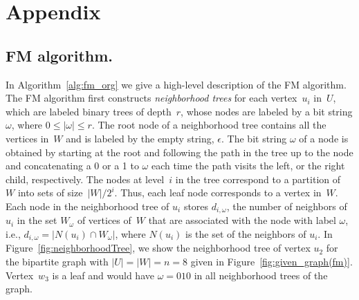 \newpage
\appendix
\section{Appendix}
\label{sec:appendix}

\subsection{\textsf{FM} algorithm.}\label{sec:appendix:FM}

In Algorithm~\ref{alg:fm_org} we give a high-level description of the \textsf{FM} algorithm. 
The \textsf{FM} algorithm first constructs \emph{neighborhood trees} for each vertex~$u_i$ in~$U$, which are
labeled binary trees of depth~$r$, whose nodes are labeled by a bit string $\omega$, where $0 \leq |\omega| \leq r$. 
The root node of a neighborhood tree contains all the vertices in~$W$ and is labeled by the empty string, $\epsilon$. 
The bit string $\omega$ of a node is obtained by starting at the root and following the path in the tree up to the node and concatenating a 0 or a 1 to $\omega$ each time the path visits the left, or the right child, respectively.
The nodes at level~$i$ in the tree correspond to a partition of~$W$ into sets of size~$|W|/2^i$. Thus, each leaf node corresponds to a vertex in~$W$. Each node in the neighborhood tree of $u_i$ stores $d_{i, \omega}$, the number of neighbors of $u_i$ in the set $W_{\omega}$ of vertices of~$W$ that are associated with the node with label $\omega$, i.e., 
$d_{i, \omega} = |N(u_i) \cap W_{\omega}|$, where $N(u_i)$ is the set of the neighbors of $u_i$.
In Figure~\ref{fig:neighborhoodTree}, we show the neighborhood tree of vertex $u_2$ for the bipartite graph with 
$|U| = |W| = n = 8$ given in Figure~\ref{fig:given_graph(fm)}. Vertex~$w_3$ is a leaf and would have $\omega =  010$ in all neighborhood trees of the graph. 


